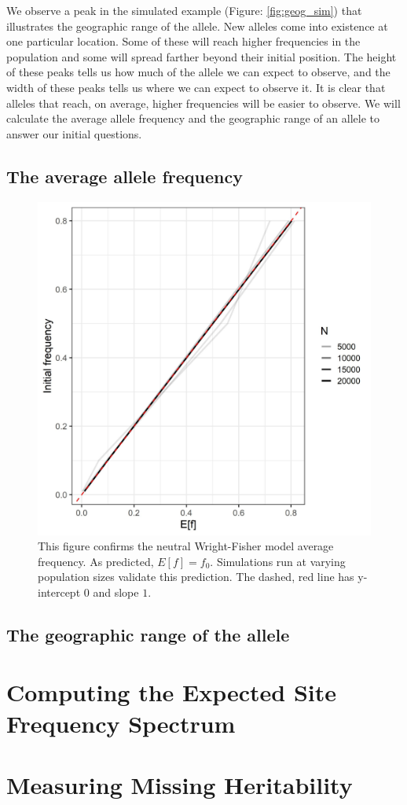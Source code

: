 We observe a peak in the simulated example (Figure: \ref{fig:geog_sim}) that illustrates the geographic range of the allele. New alleles come into existence at one particular location. Some of these will reach higher frequencies in the population and some will spread farther beyond their initial position. The height of these peaks tells us how much of the allele we can expect to observe, and the width of these peaks tells us where we can expect to observe it. It is clear that alleles that reach, on average, higher frequencies will be easier to observe. We will calculate the average allele frequency and the geographic range of an allele to answer our initial questions.



\subsection{The average allele frequency}









\begin{figure}[h]
    \centering
    \includegraphics[scale=0.5]{img/mean_f.jpg}
    \caption{This figure confirms the neutral Wright-Fisher model average frequency. As predicted, $E[f] = f_0$. Simulations run at varying population sizes validate this prediction. The dashed, red line has y-intercept $0$ and slope $1$.}
    \label{fig:mean_wf}
\end{figure}
 

\subsection{The geographic range of the allele}


\section{Computing the Expected Site Frequency Spectrum}

\section{Measuring Missing Heritability}